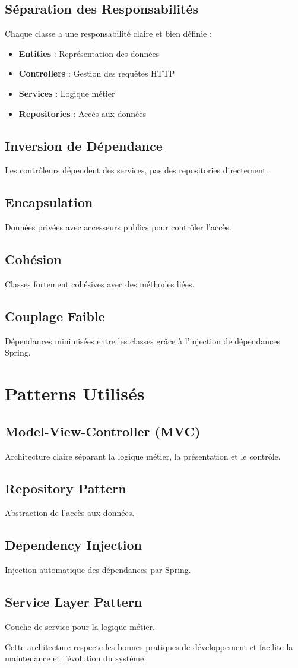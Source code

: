\documentclass[12pt,a4paper]{article}
\begin{document}
\subsection{Séparation des Responsabilités}
Chaque classe a une responsabilité claire et bien définie :
\begin{itemize}
    \item \textbf{Entities} : Représentation des données
    \item \textbf{Controllers} : Gestion des requêtes HTTP
    \item \textbf{Services} : Logique métier
    \item \textbf{Repositories} : Accès aux données
\end{itemize}

\subsection{Inversion de Dépendance}
Les contrôleurs dépendent des services, pas des repositories directement.

\subsection{Encapsulation}
Données privées avec accesseurs publics pour contrôler l'accès.

\subsection{Cohésion}
Classes fortement cohésives avec des méthodes liées.

\subsection{Couplage Faible}
Dépendances minimisées entre les classes grâce à l'injection de dépendances Spring.

\section{Patterns Utilisés}

\subsection{Model-View-Controller (MVC)}
Architecture claire séparant la logique métier, la présentation et le contrôle.

\subsection{Repository Pattern}
Abstraction de l'accès aux données.

\subsection{Dependency Injection}
Injection automatique des dépendances par Spring.

\subsection{Service Layer Pattern}
Couche de service pour la logique métier.

Cette architecture respecte les bonnes pratiques de développement et facilite la maintenance et l'évolution du système.
\end{document}
